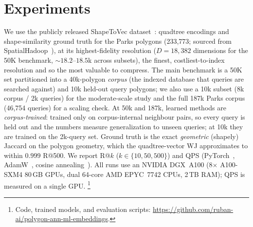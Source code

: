 \documentclass[sigconf]{acmart}
\begin{document}
\section{Experiments}
\label{sec:exp}
We use the publicly released ShapeToVec dataset~\cite{shapetovec-data}: quadtree
encodings and shape-similarity ground truth for the Parks polygons (233{,}773;
sourced from SpatialHadoop~\cite{eldawy15}), at its highest-fidelity resolution
($D{=}18{,}382$ dimensions for the 50K benchmark, ${\sim}18.2$--$18.5$k across
subsets), the finest, costliest-to-index resolution and so the most valuable to
compress. The main benchmark is a 50K set partitioned into a 40k-polygon \emph{corpus}
(the indexed database that queries are searched against) and 10k held-out query
polygons; we also use a 10k subset (8k corpus / 2k queries) for the moderate-scale
study and the full 187k Parks corpus (46{,}754 queries) for a scaling check. At 50k
and 187k, learned methods are \emph{corpus-trained}: trained only on
corpus-internal neighbour pairs, so every query is held out and the numbers measure
generalization to unseen queries; at 10k they are trained on the 2k-query set. Ground
truth is the exact \emph{geometric} (shapely) Jaccard on the polygon geometry, which
the quadtree-vector WJ approximates to within $0.999$ R@500. We report R@$k$ ($k\in\{10,50,500\}$) and QPS (PyTorch~\cite{paszke19},
AdamW~\cite{loshchilov19}, cosine annealing~\cite{loshchilov17}). All runs use an
NVIDIA DGX~A100 (8$\times$ A100-SXM4 80\,GB GPUs, dual 64-core AMD EPYC~7742 CPUs,
2\,TB RAM); QPS is measured on a single GPU. \footnote{Code, trained models, and
evaluation scripts: \url{https://github.com/ruban-ai/polygon-ann-ml-embeddings}.}
\end{document}
